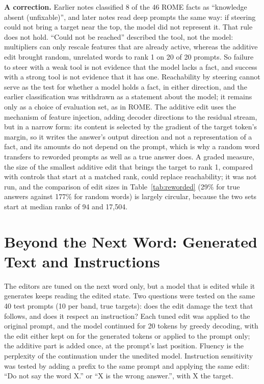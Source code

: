 \documentclass[12pt,a4paper]{report}
\begin{document}
\textbf{A correction.} Earlier notes classified 8 of the 46 ROME facts as ``knowledge absent (unfixable)'', and later notes read deep prompts the same way: if steering could not bring a target near the top, the model did not represent it. That rule does not hold. ``Could not be reached'' described the tool, not the model: multipliers can only rescale features that are already active, whereas the additive edit brought random, unrelated words to rank 1 on 20 of 20 prompts. So failure to steer with a weak tool is not evidence that the model lacks a fact, and success with a strong tool is not evidence that it has one. Reachability by steering cannot serve as the test for whether a model holds a fact, in either direction, and the earlier classification was withdrawn as a statement about the model; it remains only as a choice of evaluation set, as in ROME. The additive edit uses the mechanism of feature injection, adding decoder directions to the residual stream, but in a narrow form: its content is selected by the gradient of the target token's margin, so it writes the answer's output direction and not a representation of a fact, and its amounts do not depend on the prompt, which is why a random word transfers to reworded prompts as well as a true answer does. A graded measure, the size of the smallest additive edit that brings the target to rank 1, compared with controls that start at a matched rank, could replace reachability; it was not run, and the comparison of edit sizes in Table~\ref{tab:reworded} (29\% for true answers against 177\% for random words) is largely circular, because the two sets start at median ranks of 94 and 17,504.

\section{Beyond the Next Word: Generated Text and Instructions}\label{sec:beyond}

The editors are tuned on the next word only, but a model that is edited while it generates keeps reading the edited state. Two questions were tested on the same 40 test prompts (10 per band, true targets): does the edit damage the text that follows, and does it respect an instruction? Each tuned edit was applied to the original prompt, and the model continued for 20 tokens by greedy decoding, with the edit either kept on for the generated tokens or applied to the prompt only; the additive part is added once, at the prompt's last position. Fluency is the perplexity of the continuation under the unedited model. Instruction sensitivity was tested by adding a prefix to the same prompt and applying the same edit: ``Do not say the word X.'' or ``X is the wrong answer.'', with X the target.
\end{document}
